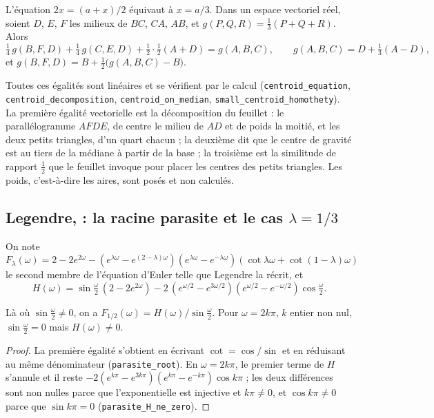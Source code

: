 \begin{enonce}
L'équation $2x = (a + x)/2$ équivaut à $x = a/3$. Dans un espace vectoriel réel, soient $D$, $E$, $F$ les milieux de $BC$, $CA$, $AB$, et $g(P, Q, R) = \tfrac13(P + Q + R)$. Alors
\[ \tfrac14\, g(B, F, D) + \tfrac14\, g(C, E, D) + \tfrac12 \cdot \tfrac12 (A + D) = g(A, B, C), \qquad g(A, B, C) = D + \tfrac13 (A - D), \]
et $g(B, F, D) = B + \tfrac12\big(g(A, B, C) - B\big)$.
\end{enonce}

Toutes ces égalités sont linéaires et se vérifient par le calcul (\texttt{centroid\_equation}, \texttt{centroid\_decomposition}, \texttt{centroid\_on\_median}, \texttt{small\_centroid\_homothety}). La première égalité vectorielle est la décomposition du feuillet : le parallélogramme $AFDE$, de centre le milieu de $AD$ et de poids la moitié, et les deux petits triangles, d'un quart chacun ; la deuxième dit que le centre de gravité est au tiers de la médiane à partir de la base ; la troisième est la similitude de rapport $\tfrac12$ que le feuillet invoque pour placer les centres des petits triangles. Les poids, c'est-à-dire les aires, sont posés et non calculés.

\subsection*{Legendre,  : la racine parasite et le cas $\lambda = 1/3$}

On note $F_\lambda(\omega) = 2 - 2e^{2\omega} - (e^{\lambda\omega} - e^{(2-\lambda)\omega})(e^{\lambda\omega} - e^{-\lambda\omega})(\cot\lambda\omega + \cot(1-\lambda)\omega)$ le second membre de l'équation d'Euler telle que Legendre la récrit, et
\[ H(\omega) = \sin\tfrac{\omega}{2}\,(2 - 2e^{2\omega}) - 2\,(e^{\omega/2} - e^{3\omega/2})(e^{\omega/2} - e^{-\omega/2})\cos\tfrac{\omega}{2} . \]

\begin{enonce}[Legendre, vues 63 et 64, la racine parasite $\sin\frac12\omega = 0$]
Là où $\sin\frac{\omega}{2} \neq 0$, on a $F_{1/2}(\omega) = H(\omega)/\sin\frac{\omega}{2}$. Pour $\omega = 2k\pi$, $k$ entier non nul, $\sin\frac{\omega}{2} = 0$ mais $H(\omega) \neq 0$.
\end{enonce}

\begin{proof}
La première égalité s'obtient en écrivant $\cot = \cos/\sin$ et en réduisant au même dénominateur (\texttt{parasite\_root}). En $\omega = 2k\pi$, le premier terme de $H$ s'annule et il reste $-2(e^{k\pi} - e^{3k\pi})(e^{k\pi} - e^{-k\pi})\cos k\pi$ ; les deux différences sont non nulles parce que l'exponentielle est injective et $k\pi \neq 0$, et $\cos k\pi \neq 0$ parce que $\sin k\pi = 0$ (\texttt{parasite\_H\_ne\_zero}).
\end{proof}

